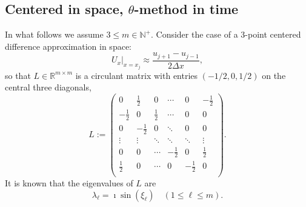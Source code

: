 \documentclass[a4paper]{article}
\newtheorem{lemma}{Lemma}
\newcommand{\dx}{\Delta x}
\newcommand{\nplus}{\mathbb{N}^+}
\begin{document}
\subsection{Centered in space, $\theta$-method in time}\label{sectioncentered}
In what follows we assume $3\le m\in\nplus$. Consider the case of a 3-point centered difference approximation in space:
\[
    U_x\Big|_{x=x_j} \approx \frac{u_{j+1}-u_{j-1}}{2\dx},
\]
so that $L\in\mathbb{R}^{m\times m}$ is a circulant matrix with entries $(-1/2, 0, 1/2)$ on the central
three diagonals,
\begin{equation}\label{Ldef}
L:=\left(
\begin{array}{cccccc}
 0 & \frac{1}{2} & 0  & \cdots & 0 & -\frac{1}{2} \\
 -\frac{1}{2} & 0 & \frac{1}{2} &  \cdots & 0 & 0 \\
 0 & -\frac{1}{2} & 0 &  \ddots & 0 & 0\\
 \vdots  & \vdots  & \ddots  & \ddots & \ddots & \vdots \\
  0 & 0 & \cdots  & -\frac{1}{2} & 0 & \frac{1}{2} \\
 \frac{1}{2} & 0 & \cdots & 0 & -\frac{1}{2} & 0 \\
\end{array}
\right).
\end{equation}
It is known that the eigenvalues of $L$ are 
\begin{equation}\label{Leigenvalues}
\lambda_\ell=\imath \sin(\xi_\ell)\quad (1\le\ell\le m).
\end{equation}
%
\end{document}
